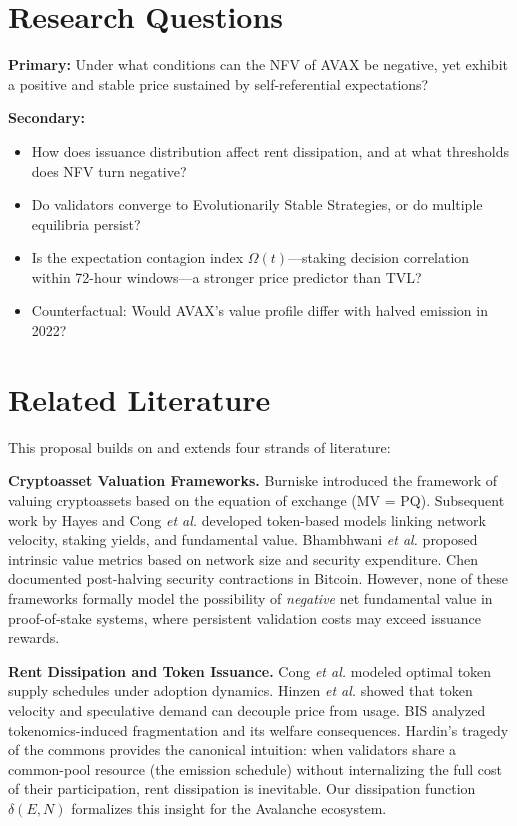 \documentclass[11pt,a4paper]{article}
\begin{document}
\section{Research Questions}

\noindent\textbf{Primary:} Under what conditions can the NFV of AVAX be negative, yet exhibit a positive and stable price sustained by self-referential expectations?

\noindent\textbf{Secondary:}
\begin{itemize}
    \item How does issuance distribution affect rent dissipation, and at what thresholds does NFV turn negative?
    \item Do validators converge to Evolutionarily Stable Strategies, or do multiple equilibria persist?
    \item Is the expectation contagion index $\Omega(t)$---staking decision correlation within 72-hour windows---a stronger price predictor than TVL?
    \item Counterfactual: Would AVAX's value profile differ with halved emission in 2022?
\end{itemize}

\section{Related Literature}

This proposal builds on and extends four strands of literature:

\noindent\textbf{Cryptoasset Valuation Frameworks.} Burniske \cite{burniske2017} introduced the framework of valuing cryptoassets based on the equation of exchange (MV = PQ). Subsequent work by Hayes \cite{hayes2019} and Cong \textit{et al.} \cite{cong2021} developed token-based models linking network velocity, staking yields, and fundamental value. Bhambhwani \textit{et al.} \cite{bhambhwani2023} proposed intrinsic value metrics based on network size and security expenditure. Chen \cite{chen2025} documented post-halving security contractions in Bitcoin. However, none of these frameworks formally model the possibility of \emph{negative} net fundamental value in proof-of-stake systems, where persistent validation costs may exceed issuance rewards.

\noindent\textbf{Rent Dissipation and Token Issuance.} Cong \textit{et al.} \cite{cong2021} modeled optimal token supply schedules under adoption dynamics. Hinzen \textit{et al.} \cite{hinzen2022} showed that token velocity and speculative demand can decouple price from usage. BIS \cite{bis2023} analyzed tokenomics-induced fragmentation and its welfare consequences. Hardin's \cite{hardin1968} tragedy of the commons provides the canonical intuition: when validators share a common-pool resource (the emission schedule) without internalizing the full cost of their participation, rent dissipation is inevitable. Our dissipation function $\delta(E, N)$ formalizes this insight for the Avalanche ecosystem.
\end{document}
